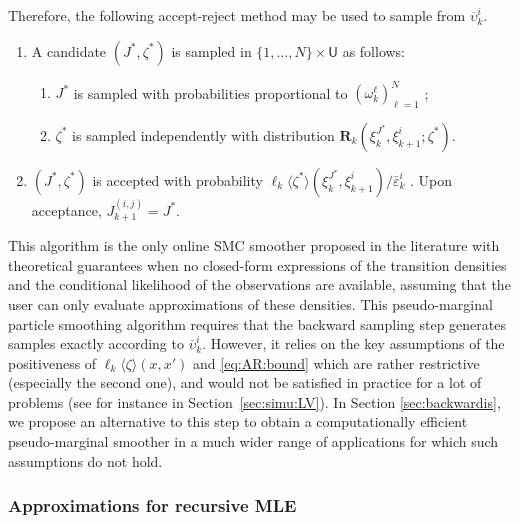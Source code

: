 \documentclass[12pt]{article}
\newcommand{\N}{N}
\newcommand{\hkup}{\bar{\varepsilon}}
\newcommand{\bi}[3]{J_{#1}^{(#2, #3)}}
\newcommand{\ewght}[2]{\ensuremath{\omega_{#1}^{#2}}}
\newcommand{\epart}[2]{\ensuremath{\xi_{#1}^{#2}}}
\newcommand{\marginalset}{\mathsf{U}}
\newcommand{\kernelmarg}{\mathbf{R}}
\newcommand{\hatqg}[1]{\mathsf{\ell}_{#1}}
\begin{document}
Therefore, the following  accept-reject method may be used to sample from $\overline \upsilon_k^i$.
\begin{enumerate}
\item A candidate $(J^\ast,\zeta^\ast)$ is sampled in $\{1,\ldots, \N\}\times\marginalset$ as follows: 
\begin{enumerate}
\item $J^\ast$ is sampled with probabilities proportional to  $(\ewght{k}{\ell})_{\ell=1}^{\N}$ ;
\item $\zeta^\ast$ is sampled independently with distribution $\kernelmarg_{k}(\epart{k}{J^\ast},\epart{k+1}{i};\zeta^\ast)$.
\end{enumerate}
\item  $(J^\ast,\zeta^\ast)$ is accepted with probability $\hatqg{k}\langle \zeta^\ast\rangle(\epart{k}{J^\ast}, \epart{k+1}{i})/\hkup_k^i$ . Upon acceptance, $\bi{k+1}{i}{j} = J^*$.
\end{enumerate}
This algorithm is the only online SMC smoother proposed in the literature with  theoretical guarantees when no closed-form expressions of  the  transition  densities and the conditional likelihood of the observations are available,  assuming that the user  can only evaluate  approximations of these densities. 
This pseudo-marginal particle smoothing algorithm  requires that the backward sampling step  generates samples exactly according to $\overline \upsilon_k^i$.  
However, it relies on the key assumptions of the positiveness of $\hatqg{k}\langle \zeta\rangle(x, x')$ and \eqref{eq:AR:bound} which are rather restrictive (especially the second one), and would not be satisfied in practice for a lot of problems (see for instance in Section~\ref{sec:simu:LV}).
 In Section \ref{sec:backwardis}, we propose an alternative to this step to obtain a computationally efficient pseudo-marginal smoother in a much wider range of applications for which such assumptions do not hold.
 
\subsubsection*{Approximations for recursive MLE}
\end{document}
